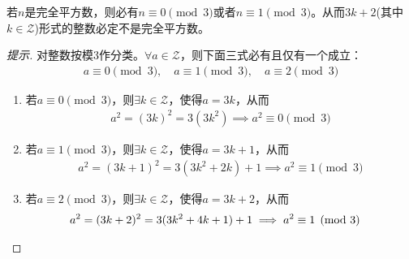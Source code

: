 \begin{example}\label{ex:3k+2-not-square}
  若$n$是完全平方数，则必有$n\equiv 0\pmod3$或者$n\equiv 1\pmod3$。从而$3k+2$(其中$k\in\mathcal{Z}$)形式的整数必定不是完全平方数。

\end{example}
\begin{proof}[提示]



  对整数按模3作分类。$\forall a\in \mathcal{Z}$，则下面三式必有且仅有一个成立：
  \begin{align*}
    a\equiv0\pmod3,\quad a\equiv1\pmod3,\quad a\equiv2\pmod3
  \end{align*}

  \begin{enumerate}
  \item 若$a\equiv0\pmod3$，则$\exists k\in\mathcal{Z}$，使得$a=3k$，从而
    \begin{align*}
      a^2=(3k)^2=3(3k^2) \implies a^2\equiv 0\pmod3
    \end{align*}
    
  \item 若$a\equiv1\pmod3$，则$\exists k\in\mathcal{Z}$，使得$a=3k+1$，从而
    \begin{align*}
      a^2 = (3k+1)^2 = 3(3k^2 + 2k) + 1 \implies a^2\equiv 1\pmod3
    \end{align*}

  \item 若$a\equiv2\pmod3$，则$\exists k\in\mathcal{Z}$，使得$a=3k+2$，从而
    \begin{align*}
      a^2=(3k+2)^2=3(3k^2+4k+1)+1 \implies a^2\equiv 1\pmod3 &\qedhere
    \end{align*}
  \end{enumerate}
\end{proof}


